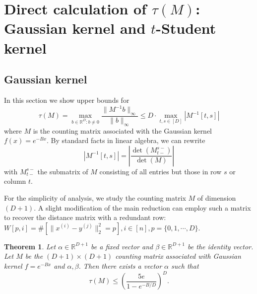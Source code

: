 \documentclass[10pt,a4paper]{article}
\newtheorem{theorem}{Theorem}
\theoremstyle{remark}
\numberwithin{equation}{section}
\numberwithin{theorem}{section}
\newcommand{\R}{\ensuremath{\mathbb{R}}}
\begin{document}
\section{Direct calculation of $\tau(M)$: Gaussian kernel and $t$-Student kernel}
\subsection{Gaussian kernel}
In this section we show upper bounds for 
\[\tau(M) = \max_{b \in \R^D: b \ne 0} \frac{\|M^{-1}b\|_{\infty}}{\|b\|_{\infty}} \le D \cdot \max_{t, s \in [D]} |M^{-1}[t, s]|\]
where $M$ is the counting matrix associated with the Gaussian kernel $f(x) = e^{-Bx}$.
By standard facts in linear algebra, we can rewrite
\[|M^{-1}[t, s]| = \left|\frac{\det(M^{s-}_{t-})}{\det(M)}\right|\]
with $M_{t-}^{s-}$ the submatrix of $M$ consisting of all entries but those in row $s$ or column $t$.

For the simplicity of analysis, we study the counting matrix $M$ of dimension $(D+1)$. A slight modification of the main reduction can employ such a matrix to recover the distance matrix with a redundant row: $W[p, i] = \#[\|x^{(i)} - y^{(j)}\|_2^2 = p], i \in [n], p = \{0, 1, \cdots, D\}$.
\begin{theorem}
Let $\alpha \in \R^{D+1}$ be a fixed vector and $\beta \in \R^{D+1}$ be the identity vector.
Let $M$ be the $(D+1) \times (D+1)$ counting matrix associated with Gaussian kernel $f = e^{-Bx}$ and $\alpha, \beta$. Then there exists a vector $\alpha$ such that
\[\tau(M) \le \left(\frac{5e}{1 - e^{-B/D}}\right)^D.\]
\end{theorem}
\end{document}
